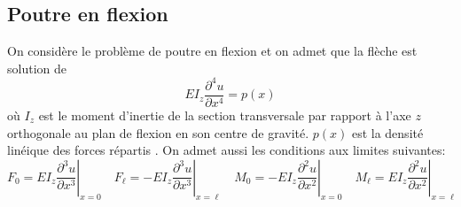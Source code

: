 \documentclass{article}
\begin{document}
\subsection*{Poutre en flexion}
\begin{center}
\end{center}
On considère le problème de poutre en flexion et on admet que la flèche est solution de
\[EI_z\frac{\partial^4 u}{\partial x^4}=p(x)\]
où $I_z$ est le moment d'inertie de la section transversale par rapport à l'axe $z$ orthogonale au plan de flexion en son centre de gravité. $p(x)$ est la densité linéique des forces répartis . On admet aussi les conditions aux limites suivantes:
\[
F_0=\left.EI_z\frac{\partial^3 u}{\partial x^3}\right|_{x=0}\quad F_\ell=-\left.EI_z\frac{\partial^3 u}{\partial x^3}\right|_{x=\ell}\quad M_0=-\left.EI_z\frac{\partial^2 u}{\partial x^2}\right|_{x=0}\quad M_\ell=\left.EI_z\frac{\partial^2 u}{\partial x^2}\right|_{x=\ell}
\]
\end{document}
